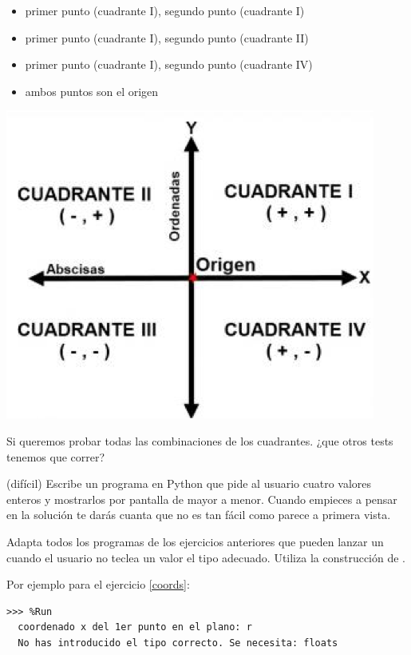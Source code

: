 \begin{ejercicio}
\begin{itemize}
    \item primer punto (cuadrante I), segundo punto (cuadrante I)
    \item primer punto (cuadrante I), segundo punto (cuadrante II)
    \item primer punto (cuadrante I), segundo punto (cuadrante IV)
    \item ambos puntos son el origen
\end{itemize}

 \includegraphics[]{images/cuadrant.png}

Si queremos probar todas las combinaciones de los cuadrantes. ¿que otros tests tenemos que correr?
\end{ejercicio}

\begin{ejercicio}(difícil) Escribe un programa en Python que pide al usuario cuatro valores enteros y mostrarlos por pantalla de mayor a menor. Cuando empieces a pensar en la solución te darás cuanta que no es tan fácil como parece a primera vista.
\end{ejercicio}

\begin{ejercicio}Adapta todos los programas de los ejercicios anteriores que pueden lanzar un  cuando el usuario no teclea un valor el tipo adecuado. Utiliza la construcción de . 

Por ejemplo para el ejercicio \ref{coords}:\\

\begin{Verbatim}[frame=single, label={\em ejemplos y posibles tests de ejecución}]
>>> %Run 
  coordenado x del 1er punto en el plano: r
  No has introducido el tipo correcto. Se necesita: floats
\end{Verbatim}
\end{ejercicio}



